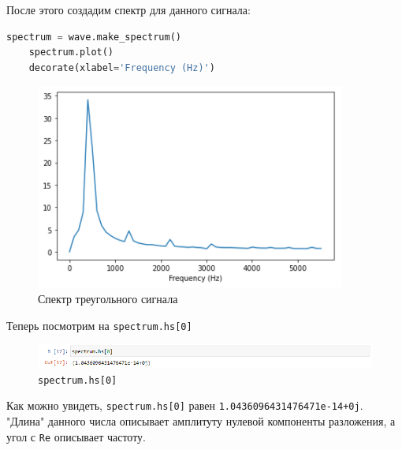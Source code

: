 \documentclass[a4paper]{article}
\begin{document}
            После этого создадим спектр для данного сигнала:
            
\begin{lstlisting}[language=Python, caption= Спектр треугольного сигнала]
    spectrum = wave.make_spectrum()
    spectrum.plot()
    decorate(xlabel='Frequency (Hz)')
\end{lstlisting}               
            
            \begin{figure}[H]
                \centering
                \includegraphics[width=\textwidth]{ex_4_triangle_signal_spectr.png}
                \caption{Спектр треугольного сигнала}
                \label{fig:ex_4_triangle_signal_spectr}
            \end{figure}
            
            Теперь посмотрим на \texttt{spectrum.hs[0]}
            
            \begin{figure}[H]
                \centering
                \includegraphics[width=\textwidth]{ex_4_spectrum_hs.png}
                \caption{\texttt{spectrum.hs[0]}}
                \label{fig:ex_4_spectrum_hs}
            \end{figure}
            
            Как можно увидеть, \texttt{spectrum.hs[0]} равен \texttt{1.0436096431476471e-14+0j}. "Длина" данного числа описывает амплитуту нулевой компоненты разложения, а угол с \texttt{Re} описывает частоту.
            
\end{document}
